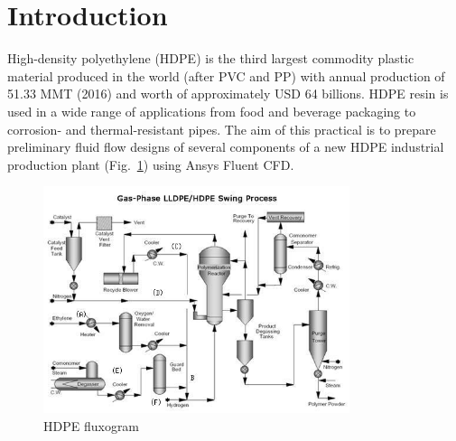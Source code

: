 \documentclass[12pts,a4paper,amsmath,amssymb,floatfix]{article}%
\begin{document}
\section{Introduction}
High-density polyethylene (HDPE) is the third largest commodity plastic material produced in the world (after PVC and PP) with annual production of 51.33 MMT (2016) and worth of approximately USD 64 billions. HDPE resin is used in a wide range of applications from food and beverage packaging to corrosion- and thermal-resistant pipes. The aim of this practical is to prepare preliminary fluid flow designs of several components of a new HDPE industrial production plant (Fig.~\ref{HDPE_Plant}) using Ansys Fluent CFD.   
 
\begin{figure}[H]
  \begin{center}
     \includegraphics[width=0.8\textwidth,clip]{./Pics/hdpe_production_img2.jpg}
     \caption{HDPE fluxogram}\label{HDPE_Plant}
  \end{center}
\end{figure}
\end{document}
